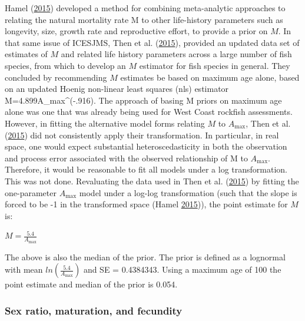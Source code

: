\documentclass[12pt,]{article}
\begin{document}
Hamel (\protect\hyperlink{ref-hamel_method_2015}{2015}) developed a
method for combining meta-analytic approaches to relating the natural
mortality rate M to other life-history parameters such as longevity,
size, growth rate and reproductive effort, to provide a prior on \(M\).
In that same issue of ICESJMS, Then et al.
(\protect\hyperlink{ref-then_evaluating_2015}{2015}), provided an
updated data set of estimates of \(M\) and related life history
parameters across a large number of fish species, from which to develop
an \(M\) estimator for fish species in general. They concluded by
recommending \(M\) estimates be based on maximum age alone, based on an
updated Hoenig non-linear least squares (nls) estimator
M=4.899A\_max\^{}(-.916). The approach of basing M priors on maximum age
alone was one that was already being used for West Coast rockfish
assessments. However, in fitting the alternative model forms relating
\(M\) to \(A_{\text{max}}\), Then et al.
(\protect\hyperlink{ref-then_evaluating_2015}{2015}) did not
consistently apply their transformation. In particular, in real space,
one would expect substantial heteroscedasticity in both the observation
and process error associated with the observed relationship of M to
\(A_{\text{max}}\). Therefore, it would be reasonable to fit all models
under a log transformation. This was not done. Revaluating the data used
in Then et al. (\protect\hyperlink{ref-then_evaluating_2015}{2015}) by
fitting the one-parameter \(A_{\text{max}}\) model under a log-log
transformation (such that the slope is forced to be -1 in the
transformed space (Hamel
\protect\hyperlink{ref-hamel_method_2015}{2015})), the point estimate
for \(M\) is:

\begin{centering}

$M=\frac{5.4}{A_{\text{max}}}$

\end{centering}

The above is also the median of the prior. The prior is defined as a
lognormal with mean \(ln(\frac{5.4}{A_{\text{max}}})\) and SE =
0.4384343. Using a maximum age of 100 the point estimate and median of
the prior is 0.054.

\subsubsection{Sex ratio, maturation, and
fecundity}\label{sex-ratio-maturation-and-fecundity}
\end{document}
